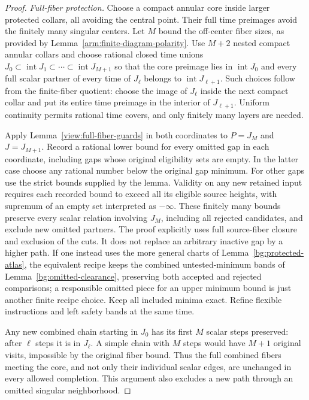 \begin{proof}
\emph{Full-fiber protection.}
Choose a compact annular core inside larger protected collars, all
avoiding the central point.  Their full time preimages avoid the finitely
many singular centers.  Let $M$ bound the off-center fiber sizes, as
provided by Lemma~\ref{arm:finite-diagram-polarity}.  Use $M+2$ nested
compact annular collars and choose rational closed time unions
$J_0\subset\operatorname{int}J_1\subset\cdots
\subset\operatorname{int}J_{M+1}$ so that the core preimage lies in
$\operatorname{int}J_0$ and every full scalar partner of every time of
$J_\ell$ belongs to $\operatorname{int}J_{\ell+1}$.  Such choices follow
from the finite-fiber quotient: choose the image of $J_\ell$ inside the
next compact collar and put its entire time preimage in the interior
of $J_{\ell+1}$.  Uniform continuity permits rational time covers,
and only finitely many layers are needed.

Apply Lemma~\ref{view:full-fiber-guards} in both coordinates to
$P=J_M$ and $J=J_{M+1}$.  Record a rational lower bound for every omitted
gap in each coordinate, including gaps whose original eligibility sets
are empty.  In the latter case choose any rational number below the
original gap minimum.  For other gaps use the strict bounds supplied by
the lemma.  Validity on any new retained input requires each recorded
bound to exceed all its eligible source heights, with supremum of an
empty set interpreted as $-\infty$.  These finitely many bounds preserve
every scalar relation involving $J_M$, including all rejected candidates,
and exclude new omitted partners.  The
proof explicitly uses full source-fiber closure and exclusion of the
cuts.  It does not replace an arbitrary inactive gap by a higher path.
If one instead uses the more general charts of
Lemma~\ref{bg:protected-atlas}, the equivalent recipe keeps the combined
untested-minimum bands of Lemma~\ref{bg:omitted-clearance}, preserving
both accepted and rejected comparisons; a responsible omitted piece
for an upper minimum bound is just another finite recipe choice.
Keep all included minima exact.  Refine flexible instructions and left
safety bands at the same time.

Any new combined chain starting in $J_0$ has its first $M$ scalar steps
preserved: after $\ell$ steps it is in $J_\ell$.  A simple chain with
$M$ steps would have $M+1$ original visits, impossible by the original
fiber bound.  Thus the full combined fibers meeting the core, and not
only their individual scalar edges, are unchanged in every allowed
completion.  This argument also excludes a new path through an omitted
singular neighborhood.


\end{proof}
